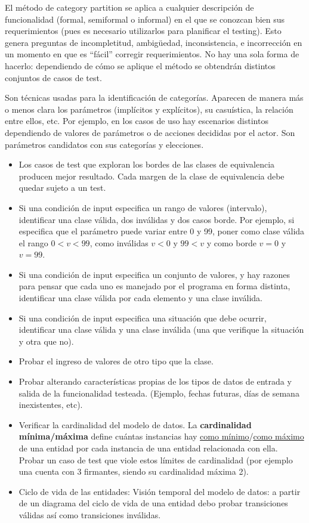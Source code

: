 \documentclass[]{article}
\begin{document}
El método de category partition se aplica a cualquier descripción de funcionalidad (formal, semiformal o informal) en el que se conozcan bien sus requerimientos (pues es necesario utilizarlos para planificar el testing). Esto genera preguntas de incompletitud, ambigüedad, inconsistencia, e incorrección en un momento en que es ``fácil'' corregir requerimientos. No hay una sola forma de hacerlo: dependiendo de cómo se aplique el método se obtendrán distintos conjuntos de casos de test.

Son técnicas usadas para la identificación de categorías. Aparecen de manera más o menos clara los parámetros (implícitos y explícitos), su casuística, la relación entre ellos, etc. Por ejemplo, en los casos de uso hay escenarios distintos dependiendo de valores de parámetros o de acciones decididas por el actor. Son parámetros candidatos con sus categorías y elecciones.

\begin{itemize}
	\item Los casos de test que exploran los bordes de las clases de equivalencia producen mejor resultado. Cada margen de la clase de equivalencia debe quedar sujeto a un test.
	\item Si una condición de input especifica un rango de valores (intervalo), identificar una clase válida, dos inválidas y dos casos borde. Por ejemplo, si especifica que el parámetro puede variar entre 0 y 99, poner como clase válida el rango $0 < v < 99$, como inválidas $v < 0$ y  $99 < v$ y como borde $v=0$ y $v=99$.
	\item Si una condición de input especifica un conjunto de valores, y hay razones para pensar que cada uno es manejado por el programa en forma distinta, identificar una clase válida por cada elemento y una clase inválida.
	\item Si una condición de input especifica una situación que debe ocurrir, identificar una clase válida y una clase inválida (una que verifique la situación y otra que no).
	\item Probar el ingreso de valores de otro tipo que la clase.
	\item Probar alterando características propias de los tipos de datos de entrada y salida de la funcionalidad testeada. (Ejemplo, fechas futuras, días de semana inexistentes, etc).
	\item Verificar la cardinalidad del modelo de datos. La \textbf{cardinalidad mínima/máxima} define cuántas instancias hay \underline{como mínimo}/\underline{como máximo} de una entidad por cada instancia de una entidad relacionada con ella. Probar un caso de test que viole estos límites de cardinalidad (por ejemplo una cuenta con 3 firmantes, siendo su cardinalidad máxima 2).
	\item Ciclo de vida de las entidades: Visión temporal del modelo de datos: a partir de un diagrama del ciclo de vida de una entidad debo probar transiciones válidas así como transiciones inválidas.
\end{itemize}
\end{document}
